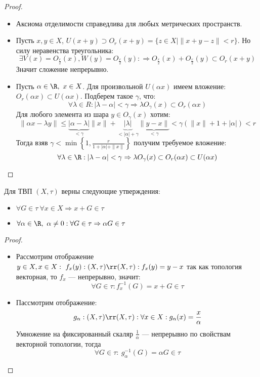 \begin{proof}
	\begin{itemize}
		\item Аксиома отделимости справедлива для любых метрических пространств. 
		\item Пусть $x,y \in X$, $U(x+y) \supset O_r(x+y) = \{z \in X \mid \|x + y -z \| < r\}$. Но силу неравенства треугольника: 
		$$
		\exists V(x) = O_{\frac{r}{2}}(x), W(y) = O_{\frac{r}{2}}(y): \Rightarrow O_{\frac{r}{2}}(x) + O_{\frac{r}{2}}(y) \subset O_r(x + y)
		$$
		Значит сложение непрерывно.
		\item Пусть $\alpha \in \R, \ x \in X$. Для произвольной $U(\alpha x )$ имеем вложение: $O_r(\alpha x) \subset U(\alpha x)$. Подберем такое $\gamma$, что: 
		$$
		\forall \lambda \in R: | \lambda - \alpha| < \gamma \Rightarrow \lambda O_\gamma(x) \subset O_r(\alpha x)
		$$ 
		Для любого элемента из шара $y \in O_\gamma(x)$ хотим:
		$$
		\|\alpha x - \lambda y \| \leq \underbrace{|\alpha - \lambda|}_{< \gamma} \|x\| + \underbrace{|\lambda|}_{< |\alpha| + \gamma }\underbrace{\|y - x\|}_{< \gamma} < \gamma ( \|x\| + 1 + |\alpha|) < r
		$$
		Тогда взяв $\gamma < \min\left\{1, \frac{ r}{1 + |\alpha| + \|x\|}\right\}$ получим требуемое вложение: 
		$$
		\forall \lambda \in \R: |\lambda - \alpha| < \gamma \Rightarrow \lambda O_\gamma(x)\subset O_r(\alpha x) \subset U(\alpha x)
		$$
	\end{itemize}
\end{proof}
\begin{claim}
	Для ТВП $(X, \tau)$ верны следующие утверждения:
	\begin{itemize}
		\item $
		\forall G \in \tau \ \forall x \in X \Rightarrow x + G \in \tau
		$
		\item $\forall \alpha \in \R, \ \alpha \neq 0: \forall G \in \tau \Rightarrow \alpha G \in \tau$
	\end{itemize}
\end{claim}
\begin{proof}
	\hfill
	\begin{itemize}
		\item 
			Рассмотрим отображение $y \in X, x \in X: \ f_x(y): (X,\tau) \rr (X,\tau): f_x(y)  = y - x$ так как топология векторная, то $f_x$ --- непрерывно, значит:
		$$
		\forall G \in \tau: f_x^{-1}(G) = x + G \in \tau
		$$
		\item  Пассмотрим отображение: 
		$$
		g_\alpha : (X,\tau) \rr (X,\tau): \forall x \in X : g_\alpha (x) = \frac{x}{\alpha} 
		$$
		Умножение на фиксированный скаляр $\frac{1}{\alpha}$ --- непрерывно по свойствам векторной топологии, тогда 
		$$
		\forall G \in \tau: \ g_\alpha^{-1}(G) = \alpha G \in \tau
		$$
	\end{itemize}
\end{proof}
